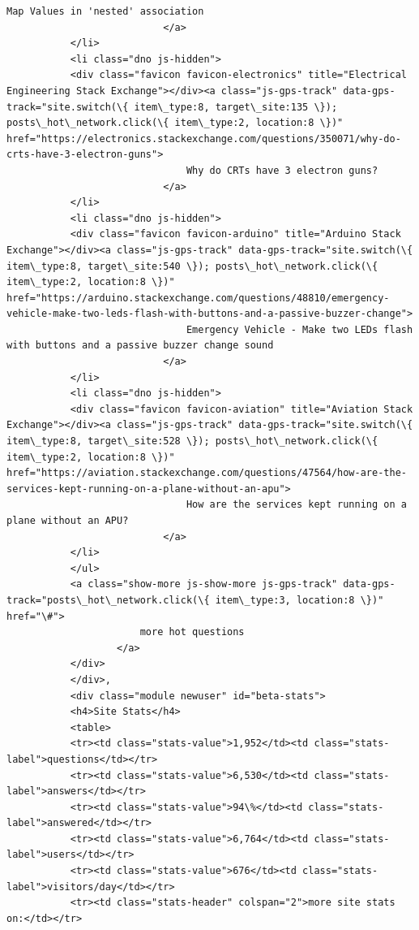 \documentclass[11pt]{article}
\begin{document}
\begin{Verbatim}[commandchars=\\\{\}]
                               Map Values in 'nested' association
                           </a>
           </li>
           <li class="dno js-hidden">
           <div class="favicon favicon-electronics" title="Electrical Engineering Stack Exchange"></div><a class="js-gps-track" data-gps-track="site.switch(\{ item\_type:8, target\_site:135 \}); posts\_hot\_network.click(\{ item\_type:2, location:8 \})" href="https://electronics.stackexchange.com/questions/350071/why-do-crts-have-3-electron-guns">
                               Why do CRTs have 3 electron guns?
                           </a>
           </li>
           <li class="dno js-hidden">
           <div class="favicon favicon-arduino" title="Arduino Stack Exchange"></div><a class="js-gps-track" data-gps-track="site.switch(\{ item\_type:8, target\_site:540 \}); posts\_hot\_network.click(\{ item\_type:2, location:8 \})" href="https://arduino.stackexchange.com/questions/48810/emergency-vehicle-make-two-leds-flash-with-buttons-and-a-passive-buzzer-change">
                               Emergency Vehicle - Make two LEDs flash with buttons and a passive buzzer change sound
                           </a>
           </li>
           <li class="dno js-hidden">
           <div class="favicon favicon-aviation" title="Aviation Stack Exchange"></div><a class="js-gps-track" data-gps-track="site.switch(\{ item\_type:8, target\_site:528 \}); posts\_hot\_network.click(\{ item\_type:2, location:8 \})" href="https://aviation.stackexchange.com/questions/47564/how-are-the-services-kept-running-on-a-plane-without-an-apu">
                               How are the services kept running on a plane without an APU?
                           </a>
           </li>
           </ul>
           <a class="show-more js-show-more js-gps-track" data-gps-track="posts\_hot\_network.click(\{ item\_type:3, location:8 \})" href="\#">
                       more hot questions
                   </a>
           </div>
           </div>,
           <div class="module newuser" id="beta-stats">
           <h4>Site Stats</h4>
           <table>
           <tr><td class="stats-value">1,952</td><td class="stats-label">questions</td></tr>
           <tr><td class="stats-value">6,530</td><td class="stats-label">answers</td></tr>
           <tr><td class="stats-value">94\%</td><td class="stats-label">answered</td></tr>
           <tr><td class="stats-value">6,764</td><td class="stats-label">users</td></tr>
           <tr><td class="stats-value">676</td><td class="stats-label">visitors/day</td></tr>
           <tr><td class="stats-header" colspan="2">more site stats on:</td></tr>

\end{Verbatim}
\end{document}
